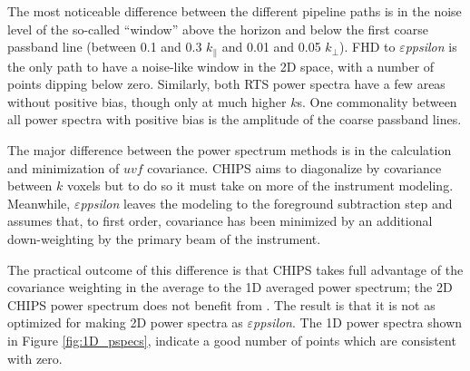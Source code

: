 \documentclass[twolcolumn,iop]{emulateapj}
\def\eppsilon{{\it $\varepsilon$ppsilon}}
\begin{document}
The most noticeable difference between the different pipeline paths is in the noise level of the so-called ``window'' above the horizon and below the first coarse passband line (between 0.1 and 0.3 $k_\parallel$ and 0.01 and 0.05 $k_\perp$). FHD to \eppsilon{} is the only path to have a noise-like window in the 2D space, with a number of points dipping below zero. Similarly, both RTS power spectra have a few areas without positive bias, though only at much higher $k$s.  One commonality between all power spectra with positive bias is the amplitude of the coarse passband lines.


The major difference between the power spectrum methods is in the calculation and minimization of $uvf$ covariance.   CHIPS aims to diagonalize by covariance between $k$ voxels but to do so it must take on more of the instrument modeling. Meanwhile, \eppsilon{} leaves the modeling to the foreground subtraction step and assumes that, to first order, covariance has been minimized by an additional down-weighting by the primary beam of the instrument.  

The practical outcome of this difference is that CHIPS takes full advantage of the covariance weighting in the average to the 1D averaged power spectrum; the 2D CHIPS power spectrum does not benefit from . The result is that it is not as optimized for making 2D power spectra as \eppsilon{}.  The 1D power spectra shown in Figure \ref{fig:1D_pspecs}, indicate a good number of points which are consistent with zero.
\end{document}
